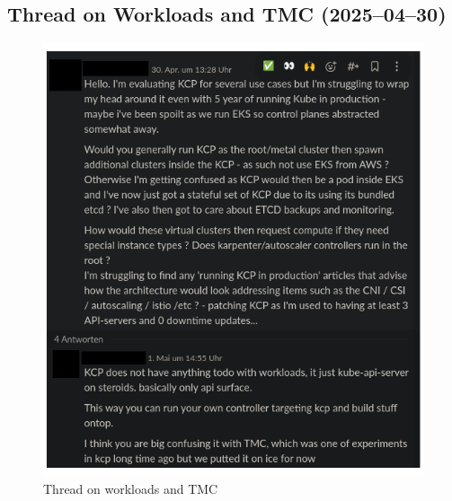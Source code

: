 \documentclass[11pt, a4paper, oneside, listof=totoc]{scrartcl}
\begin{document}
            \subsection{Thread on Workloads and TMC (2025--04--30)}
                \begin{figure}[h!]
                    \centering
                    \includegraphics[width=\textwidth]{screenshots/slack/workloads.anonymized.png}
                    \caption{Thread on workloads and TMC}\label{fig:workloads}
                \end{figure}
            
            \FloatBarrier
\end{document}

